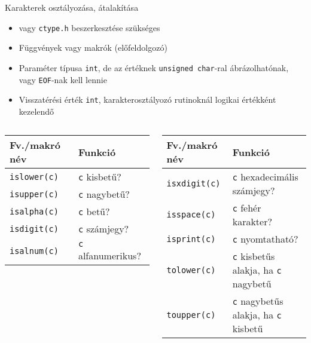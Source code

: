 \documentclass[usenames,dvipsnames,aspectratio=169]{beamer}
\begin{document}
\begin{frame}
  Karakterek osztályozása, átalakítása
  \begin{itemize}
    \item {} vagy \texttt{ctype.h} beszerkesztése szükséges
    \item Függvények vagy makrók (előfeldolgozó)
    \item Paraméter típusa \texttt{int}, de az értéknek \texttt{unsigned char}-ral ábrázolhatónak, vagy \texttt{EOF}-nak kell lennie
    \item Visszatérési érték \texttt{int}, karakterosztályozó rutinoknál logikai értékként kezelendő
  \end{itemize}
  \begin{columns}[T]
      \begin{tabular}{ll}
        Fv./makró név & Funkció\\ \hline
        \texttt{islower(c)} & \texttt{c} kisbetű?\\
        \texttt{isupper(c)} & \texttt{c} nagybetű?\\
        \texttt{isalpha(c)} & \texttt{c} betű?\\
        \texttt{isdigit(c)} & \texttt{c} számjegy?\\
        \texttt{isalnum(c)} & \texttt{c} alfanumerikus?\\
      \end{tabular}
      \begin{tabular}{ll}
        Fv./makró név & Funkció\\ \hline
        \texttt{isxdigit(c)} & \texttt{c} hexadecimális számjegy?\\
        \texttt{isspace(c)} & \texttt{c} fehér karakter?\\
        \texttt{isprint(c)} & \texttt{c} nyomtatható?\\
        \texttt{tolower(c)} & \texttt{c} kisbetűs alakja, ha \texttt{c} nagybetű\\
        \texttt{toupper(c)} & \texttt{c} nagybetűs alakja, ha \texttt{c} kisbetű
      \end{tabular}
  \end{columns}
\end{frame}

\begin{frame}
  \begin{exampleblock}{}
  \vspace{-.2cm}
  
  \vspace{-.2cm}
\end{exampleblock}
\end{frame}
\end{document}
